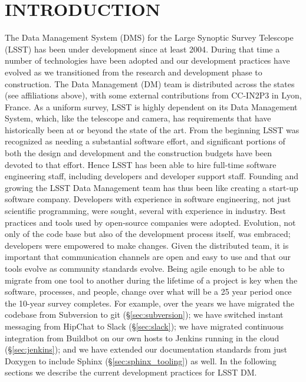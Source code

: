 \section{INTRODUCTION}

The Data Management System (DMS)\cite{2015arXiv151207914J} for the Large Synoptic Survey Telescope (LSST) \cite{2008arXiv0805.2366I} has been under development since at least 2004\cite{2004AAS...20510811A}.
During that time a number of technologies have been adopted and our development practices have evolved as we transitioned from the research and development phase to construction.
The Data Management (DM) team is distributed across the states (see affiliations above),  with some external contributions from CC-IN2P3 in Lyon, France.
As a uniform survey, LSST is highly dependent on its Data Management System, which, like the telescope and camera, has requirements that have historically been at or beyond the state of the art.
From the beginning LSST was recognized as needing a substantial software effort, and significant portions of both the design and development and the construction budgets have been devoted to that effort.
Hence LSST has been able to hire full-time software engineering staff, including developers and developer support staff.
Founding and growing the LSST Data Management team has thus been like creating a start-up software company.
Developers with experience in software engineering, not just scientific programming, were sought, several with experience in industry.
Best practices and tools used by open-source companies were adopted.
Evolution, not only of the code base but also of the development process itself, was embraced; developers were empowered to make changes.
Given the distributed team, it is important that communication channels are open and easy to use and that our tools evolve as community standards evolve.
Being agile enough to be able to migrate from one tool to another during the lifetime of a project is key when the software, processes, and people, change over what will be a 25 year period once the 10-year survey completes.
For example, over the years we have migrated the codebase from Subversion to git (\S\ref{sec:subversion}); we have switched instant messaging from HipChat to Slack (\S\ref{sec:slack}); we have migrated continuous integration from Buildbot on our own hosts to Jenkins running in the cloud (\S\ref{sec:jenkins}); and we have extended our documentation standards from just Doxygen to include Sphinx (\S\ref{sec:sphinx_tooling}) as well.
In the following sections we describe the current development practices for LSST DM.
